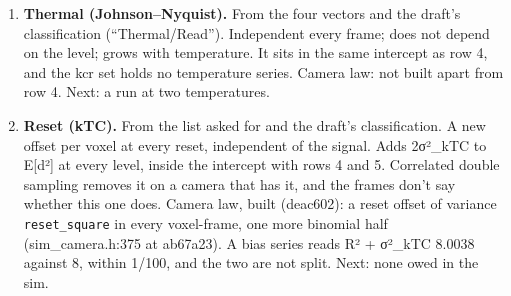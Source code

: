\begin{enumerate}
\item \textbf{Thermal (Johnson–Nyquist).} From the four vectors and the draft's classification (“Thermal/Read”). Independent every frame; does not depend on the level; grows with temperature. It sits in the same intercept as row 4, and the kcr set holds no temperature series. Camera law: not built apart from row 4. Next: a run at two temperatures.
\item \textbf{Reset (kTC).} From the list asked for and the draft's classification. A new offset per voxel at every reset, independent of the signal. Adds 2σ²\_\allowbreak{}kTC to E[d²] at every level, inside the intercept with rows 4 and 5. Correlated double sampling removes it on a camera that has it, and the frames don't say whether this one does. Camera law, built (deac602): a reset offset of variance \texttt{reset\_\allowbreak{}square} in every voxel-frame, one more binomial half (sim\_\allowbreak{}camera.h:375 at ab67a23). A bias series reads R² + σ²\_\allowbreak{}kTC 8.0038 against 8, within 1/100, and the two are not split. Next: none owed in the sim.


\end{enumerate}
